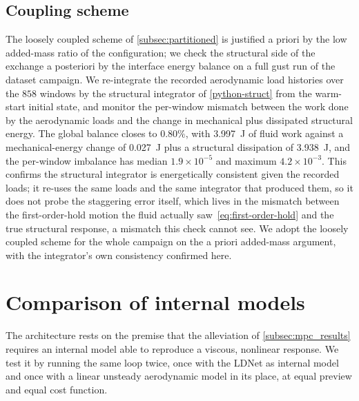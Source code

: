 \subsection{Coupling scheme}
\label{subsubsec:coupling_check}
The loosely coupled scheme of \cref{subsec:partitioned} is justified a priori by the low added-mass ratio of the configuration; we check the structural side of the exchange a posteriori by the interface energy balance on a full gust run of the dataset campaign. We re-integrate the recorded aerodynamic load histories over the $858$ windows by the structural integrator of \cref{python-struct} from the warm-start initial state, and monitor the per-window mismatch between the work done by the aerodynamic loads and the change in mechanical plus dissipated structural energy. The global balance closes to $0.80\%$, with \SI{3.997}{\joule} of fluid work against a mechanical-energy change of \SI{0.027}{\joule} plus a structural dissipation of \SI{3.938}{\joule}, and the per-window imbalance has median $1.9\times10^{-5}$ and maximum $4.2\times10^{-3}$. This confirms the structural integrator is energetically consistent given the recorded loads; it re-uses the same loads and the same integrator that produced them, so it does not probe the staggering error itself, which lives in the mismatch between the first-order-hold motion the fluid actually saw~\eqref{eq:first-order-hold} and the true structural response, a mismatch this check cannot see. We adopt the loosely coupled scheme for the whole campaign on the a priori added-mass argument, with the integrator's own consistency confirmed here.


\section{Comparison of internal models}
\label{app:modelcomp}

The architecture rests on the premise that the alleviation of \cref{subsec:mpc_results}
requires an internal model able to reproduce a viscous, nonlinear response. We test it by
running the same loop twice, once with the LDNet as internal model and once with a linear
unsteady aerodynamic model in its place, at equal preview and equal cost function.

